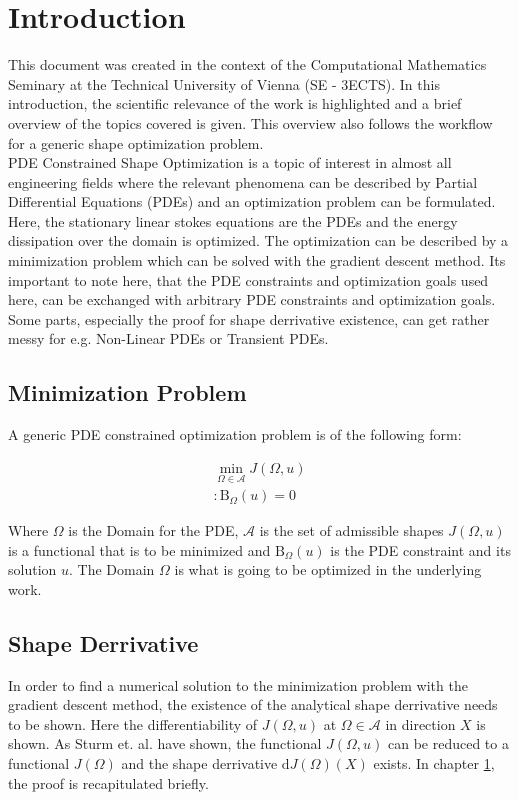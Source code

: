 \section{Introduction}

This document was created in the context of the Computational Mathematics Seminary
at the Technical University of Vienna (SE - 3ECTS). In this introduction, the scientific relevance
of the work is highlighted and a brief overview of the topics covered is given. This overview
also follows the workflow for a generic shape optimization problem.\\

PDE Constrained Shape Optimization is a topic of interest in almost all engineering fields
where the relevant phenomena can be described by Partial Differential Equations (PDEs) and
an optimization problem can be formulated. Here, the stationary linear stokes equations are
the PDEs and the energy dissipation over the domain is optimized. The optimization can 
be described by a minimization problem which can be solved with the gradient descent method.
Its important to note here, that the PDE constraints and optimization goals used here, 
can be exchanged with arbitrary PDE constraints and optimization goals. Some parts,
especially the proof for shape derrivative existence, can get rather messy for e.g. 
Non-Linear PDEs or Transient PDEs.\\

\subsection*{Minimization Problem}
A generic PDE constrained optimization problem is of the following form:

\begin{align*}
        \min_{ \Omega \in \mathcal{A} } J( \Omega, u) \\
        : \mathrm{B}_{\Omega}(u) = 0
\end{align*}

Where $\Omega$ is the Domain for the PDE, $\mathcal{A}$ is the set of admissible shapes
$J(\Omega, u)$ is a functional that is to be minimized and $\mathrm{B}_{\Omega}(u)$ is the PDE
constraint and its solution $u$. The Domain $\Omega$ is what is going to be 
optimized in the underlying work. \\

\subsection*{Shape Derrivative}
In order to find a numerical solution to the minimization problem with the gradient descent
method, the existence of the analytical shape derrivative needs to be shown. Here the
differentiability of $J(\Omega,u)$ at $\Omega \in \mathcal{A}$ in direction $X$ is shown. 
As Sturm et. al. \cite{nearly_conformal_paper} have shown, the functional 
$J(\Omega, u)$ can be reduced to a functional $J(\Omega)$ and the shape derrivative 
$\mathrm{d}J(\Omega)(X)$ exists. In chapter \ref*{}, the proof is recapitulated briefly.



